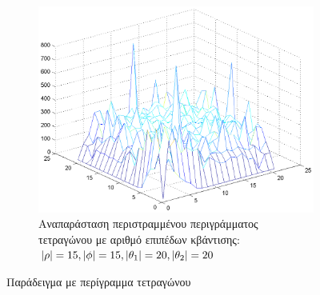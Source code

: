 \begin{figure}
        \centering
        \begin{subfigure}[b]{1\textwidth}
                \centerline{\includegraphics[scale = 0.3]{./images/examples/emptyRotatedTetragwno(15152020).png}}
                \caption{Αναπαράσταση περιστραμμένου περιγράμματος τετραγώνου με αριθμό επιπέδων κβάντισης: $\lvert\rho\rvert = 15,\lvert\phi\rvert = 15,\lvert\theta_1\rvert = 20,\lvert\theta_2\rvert = 20$}
        \end{subfigure}%
        \caption{Παράδειγμα με περίγραμμα τετραγώνου}
\end{figure}

